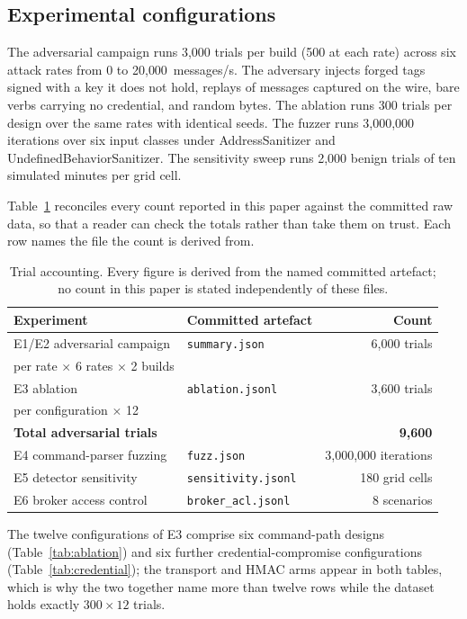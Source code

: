\subsection{Experimental configurations}

The adversarial campaign runs 3{,}000 trials per build (500 at each rate) across six attack rates from 0 to
20{,}000~messages/s. The adversary injects forged tags signed with a key it does not hold,
replays of messages captured on the wire, bare verbs carrying no credential, and random bytes.
The ablation runs 300 trials per design over the same rates with identical seeds. The fuzzer
runs 3{,}000{,}000 iterations over six input classes under AddressSanitizer and
UndefinedBehaviorSanitizer. The sensitivity sweep runs 2{,}000 benign trials of ten simulated
minutes per grid cell.

Table~\ref{tab:accounting} reconciles every count reported in this paper against the committed
raw data, so that a reader can check the totals rather than take them on trust. Each row names
the file the count is derived from.

\begin{table}[htbp]
\centering\small
\caption{Trial accounting. Every figure is derived from the named committed artefact; no count
in this paper is stated independently of these files.}
\label{tab:accounting}
\begin{tabular}{@{}llr@{}}
\toprule
Experiment & Committed artefact & Count \\
\midrule
E1/E2 adversarial campaign & \texttt{summary.json} & 6{,}000 trials \\
\quad 500 per rate $\times$ 6 rates $\times$ 2 builds & & \\
E3 ablation & \texttt{ablation.jsonl} & 3{,}600 trials \\
\quad 300 per configuration $\times$ 12 & & \\
\midrule
\textbf{Total adversarial trials} & & \textbf{9{,}600} \\
\midrule
E4 command-parser fuzzing & \texttt{fuzz.json} & 3{,}000{,}000 iterations \\
E5 detector sensitivity & \texttt{sensitivity.jsonl} & 180 grid cells \\
E6 broker access control & \texttt{broker\_acl.jsonl} & 8 scenarios \\
\bottomrule
\end{tabular}
\end{table}

The twelve configurations of E3 comprise six command-path designs (Table~\ref{tab:ablation})
and six further credential-compromise configurations (Table~\ref{tab:credential}); the
transport and HMAC arms appear in both tables, which is why the two together name more than
twelve rows while the dataset holds exactly $300 \times 12$ trials.

